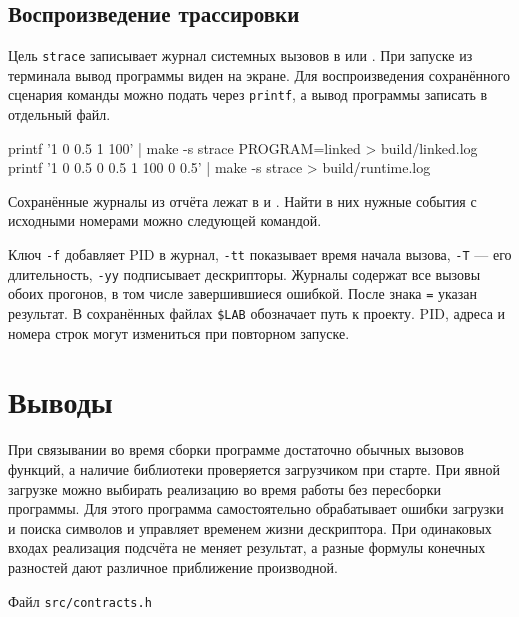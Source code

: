 \documentclass[12pt,a4paper]{article}
\begin{document}
\subsection{Воспроизведение трассировки}
Цель \texttt{strace} записывает журнал системных вызовов в  или . При запуске из терминала вывод программы виден на экране. Для воспроизведения сохранённого сценария команды можно подать через \texttt{printf}, а вывод программы записать в отдельный файл.
\begin{terminal}
printf '1 0 0.5 1 100\n' | make -s strace PROGRAM=linked > build/linked.log
printf '1 0 0.5 0 0.5 1 100 0 0.5\n' |
  make -s strace > build/runtime.log
\end{terminal}
Сохранённые журналы из отчёта лежат в  и . Найти в них нужные события с исходными номерами можно следующей командой.
Ключ \texttt{-f} добавляет PID в журнал, \texttt{-tt} показывает время начала вызова, \texttt{-T} --- его длительность, \texttt{-yy} подписывает дескрипторы. Журналы содержат все вызовы обоих прогонов, в том числе завершившиеся ошибкой. После знака \texttt{=} указан результат. В сохранённых файлах \texttt{\$LAB} обозначает путь к проекту. PID, адреса и номера строк могут измениться при повторном запуске.
\par
\endgroup

\section{Выводы}
При связывании во время сборки программе достаточно обычных вызовов функций, а наличие библиотеки проверяется загрузчиком при старте. При явной загрузке можно выбирать реализацию во время работы без пересборки программы. Для этого программа самостоятельно обрабатывает ошибки загрузки и поиска символов и управляет временем жизни дескриптора. При одинаковых входах реализация подсчёта не меняет результат, а разные формулы конечных разностей дают различное приближение производной.

\begin{listingblock}{Файл \texttt{src/contracts.h}}
\end{listingblock}
\end{document}
